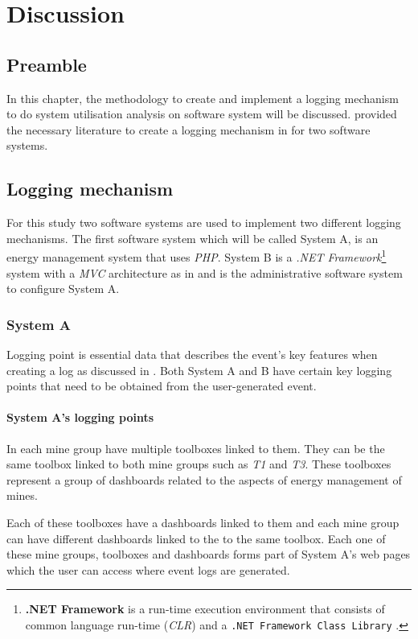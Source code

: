 
\chapter{Discussion}
\label{chap:5}

\section{Preamble}
In this chapter, the methodology to create and implement a logging mechanism to do system utilisation analysis on software system will be discussed.  provided the necessary literature to create a logging mechanism in  for two software systems.

\section{Logging mechanism}\label{sec:Ch3_LoggingMechanism}
For this study two software systems are used to implement two different logging mechanisms. The first software system which will be called System A, is an energy management system that uses \emph{PHP}. System B is a \emph{.NET Framework}\footnote{\label{ftn:NetFramework}\textbf{.NET Framework} is a run-time execution environment that consists of common language run-time (\emph{CLR}) and a \texttt{.NET Framework Class Library} \cite{Harkness2007}.} system with a \emph{MVC} architecture as in  and is the administrative software system to configure System A.

\clearpage

\subsection{System A}
Logging point is essential data that describes the event's key features when creating a log as discussed in . Both System A and B have certain key logging points that need to be obtained from the user-generated event.

\subsubsection{System A's logging points}\label{sec:SystemA_LoggingPoints}
In  each mine group have multiple toolboxes linked to them. They can be the same toolbox linked to both mine groups such as \emph{T1} and \emph{T3}. These toolboxes represent a group of dashboards related to the aspects of energy management of mines.\par Each of these toolboxes have a dashboards linked to them and each mine group can have different dashboards linked to the to the same toolbox. Each one of these mine groups, toolboxes and dashboards forms part of System A's web pages which the user can access where event logs are generated.

